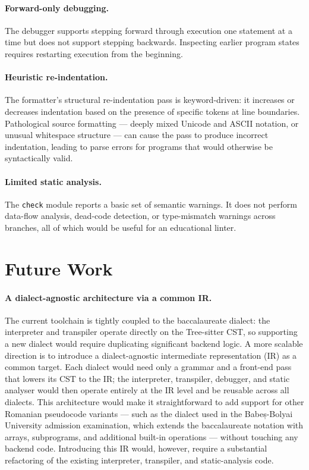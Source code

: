 \paragraph{Forward-only debugging.}
The debugger supports stepping forward through execution one statement at
a time but does not support stepping backwards.  Inspecting earlier
program states requires restarting execution from the beginning.

\paragraph{Heuristic re-indentation.}
The formatter's structural re-indentation pass is keyword-driven: it
increases or decreases indentation based on the presence of specific
tokens at line boundaries.  Pathological source formatting --- deeply
mixed Unicode and ASCII notation, or unusual whitespace structure ---
can cause the pass to produce incorrect indentation, leading to parse
errors for programs that would otherwise be syntactically valid.

\paragraph{Limited static analysis.}
The \texttt{check} module reports a basic set of semantic warnings.
It does not perform data-flow analysis, dead-code detection, or
type-mismatch warnings across branches, all of which would be useful
for an educational linter.

\section{Future Work}
\label{sec:future}

\paragraph{A dialect-agnostic architecture via a common IR.}
The current toolchain is tightly coupled to the baccalaureate dialect:
the interpreter and transpiler operate directly on the Tree-sitter CST,
so supporting a new dialect would require duplicating significant backend
logic.  A more scalable direction is to introduce a dialect-agnostic
intermediate representation (IR) as a common target.  Each dialect would
need only a grammar and a front-end pass that lowers its CST to the IR;
the interpreter, transpiler, debugger, and static analyser would then
operate entirely at the IR level and be reusable across all dialects.
This architecture would make it straightforward to add support for other
Romanian pseudocode variants --- such as the dialect used in the
Babeș-Bolyai University admission examination, which extends the
baccalaureate notation with arrays, subprograms, and additional
built-in operations --- without touching any backend code.  Introducing
this IR would, however, require a substantial refactoring of the existing
interpreter, transpiler, and static-analysis code.

